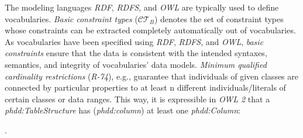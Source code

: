 \documentclass{llncs}
\newcommand{\ms}[1]{\texttt{#1}}
\begin{document}
The modeling languages \emph{RDF}, \emph{RDFS}, and \emph{OWL} are typically used to define vocabularies.
\emph{Basic constraint types} ($\mathcal{CT}_{B}$) 
denotes the set of constraint types whose constraints 
can be extracted completely automatically out of vocabularies.
As vocabularies have been specified using \emph{RDF}, \emph{RDFS}, and \emph{OWL},
\emph{basic constraints} ensure that the data is consistent with the intended syntaxes, semantics, and integrity of vocabularies' data models.
\emph{Minimum qualified cardinality restrictions} (\emph{R-74}), e.g., guarantee that individuals of given classes are connected by particular properties to at least n different individuals/literals of certain classes or data ranges.
This way, it is expressible in \emph{OWL 2} that a \emph{phdd:TableStructure} has (\emph{phdd:column}) at least one \emph{phdd:Column}:
\begin{ex}
 .
\end{ex}
\end{document}
